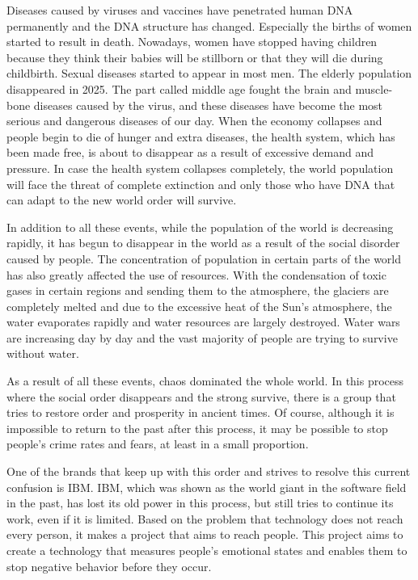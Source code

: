 \documentclass[]{book}
\begin{document}
Diseases caused by viruses and vaccines have penetrated human DNA permanently and the DNA structure has changed. Especially the births of women started to result in death. Nowadays, women have stopped having children because they think their babies will be stillborn or that they will die during childbirth. Sexual diseases started to appear in most men. The elderly population disappeared in 2025. The part called middle age fought the brain and muscle-bone diseases caused by the virus, and these diseases have become the most serious and dangerous diseases of our day. When the economy collapses and people begin to die of hunger and extra diseases, the health system, which has been made free, is about to disappear as a result of excessive demand and pressure. In case the health system collapses completely, the world population will face the threat of complete extinction and only those who have DNA that can adapt to the new world order will survive.

In addition to all these events, while the population of the world is decreasing rapidly, it has begun to disappear in the world as a result of the social disorder caused by people. The concentration of population in certain parts of the world has also greatly affected the use of resources. With the condensation of toxic gases in certain regions and sending them to the atmosphere, the glaciers are completely melted and due to the excessive heat of the Sun's atmosphere, the water evaporates rapidly and water resources are largely destroyed. Water wars are increasing day by day and the vast majority of people are trying to survive without water.

As a result of all these events, chaos dominated the whole world. In this process where the social order disappears and the strong survive, there is a group that tries to restore order and prosperity in ancient times. Of course, although it is impossible to return to the past after this process, it may be possible to stop people's crime rates and fears, at least in a small proportion.

One of the brands that keep up with this order and strives to resolve this current confusion is IBM. IBM, which was shown as the world giant in the software field in the past, has lost its old power in this process, but still tries to continue its work, even if it is limited. Based on the problem that technology does not reach every person, it makes a project that aims to reach people. This project aims to create a technology that measures people's emotional states and enables them to stop negative behavior before they occur.
\end{document}
